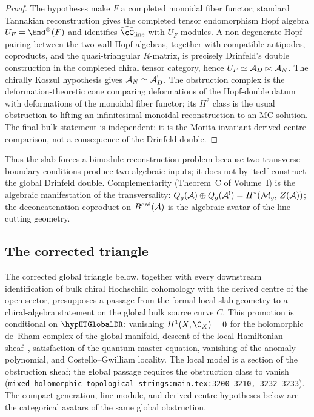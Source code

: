 \begin{proof}
The hypotheses make $F$ a completed monoidal fiber functor; standard
Tannakian reconstruction gives the completed tensor endomorphism Hopf
algebra $U_F=\End^\otimes(F)$ and identifies
$\widehat{\cC}_{\mathrm{line}}$ with $U_F$-modules. A non-degenerate
Hopf pairing between the two wall Hopf algebras, together with
compatible antipodes, coproducts, and the quasi-triangular
$R$-matrix, is precisely Drinfeld's double construction in the
completed chiral tensor category, hence $U_F\simeq\mathcal{A}_D\bowtie\mathcal{A}_N$.
The chirally Koszul hypothesis gives $\mathcal{A}_N\simeq\mathcal{A}_D^!$. The
obstruction complex is the deformation-theoretic cone comparing
deformations of the Hopf-double datum with deformations of the
monoidal fiber functor; its $H^2$ class is the usual obstruction to
lifting an infinitesimal monoidal reconstruction to an MC solution.
The final bulk statement is independent: it is the Morita-invariant
derived-centre comparison, not a consequence of the Drinfeld double.
\end{proof}

Thus the slab forces a bimodule reconstruction problem because two
transverse boundary conditions produce two algebraic inputs; it does
not by itself construct the global Drinfeld double. Complementarity
(Theorem~C of Volume~I) is the algebraic manifestation of the
transversality:
$Q_g(\mathcal{A}) \oplus Q_g(\mathcal{A}^!) = H^*(\overline{\mathcal{M}}_g,\, Z(\mathcal{A}))$; the
deconcatenation coproduct on $B^{\mathrm{ord}}(\mathcal{A})$ is the algebraic
avatar of the line-cutting geometry.

\subsection{The corrected triangle}

\begin{remark}
\label{rem:ht-global-de-rham-ht-bulk-boundary-line-core}
The corrected global triangle below, together with every downstream
identification of bulk chiral Hochschild cohomology with the
derived centre of the open sector, presupposes a passage from the
formal-local slab geometry to a chiral-algebra statement on the
global bulk source curve $C$. This promotion is conditional on
$\hypHTGlobalDR$: vanishing $H^1(X,\C_X) = 0$ for the holomorphic
de~Rham complex of the global manifold, descent of the local
Hamiltonian sheaf~\cite[\S4--5]{CG17}, satisfaction of the
quantum master equation, vanishing of the anomaly polynomial, and
Costello--Gwilliam locality. The local model is a section of the
obstruction sheaf; the global passage requires the obstruction
class to vanish
(\texttt{mixed-holomorphic-topological-strings:main.tex:3200--3210,
3232--3233}). The compact-generation, line-module, and
derived-centre hypotheses below are the categorical avatars of the
same global obstruction.
\end{remark}

